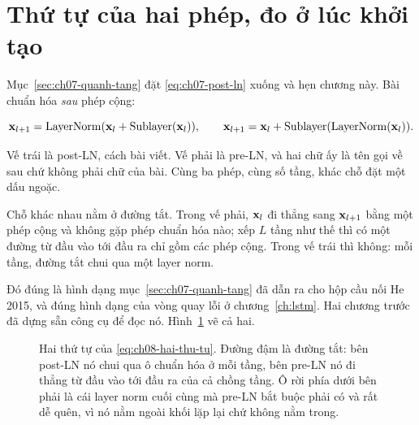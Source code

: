 \section{Thứ tự của hai phép, đo ở lúc khởi tạo}
\label{sec:ch08-thu-tu-ln}

%
Mục~\ref{sec:ch07-quanh-tang} đặt \eqref{eq:ch07-post-ln} xuống và hẹn chương
này. Bài chuẩn hóa \emph{sau} phép cộng:

\begin{equation}
  \mathbf{x}_{l+1} = \operatorname{LayerNorm}(\mathbf{x}_l + \mathrm{Sublayer}(\mathbf{x}_l)),
  \qquad
  \mathbf{x}_{l+1} = \mathbf{x}_l + \mathrm{Sublayer}(\operatorname{LayerNorm}(\mathbf{x}_l)).
  \label{eq:ch08-hai-thu-tu}
\end{equation}

Vế trái là post-LN, cách bài viết. Vế phải là pre-LN, và hai chữ ấy là tên gọi
về sau chứ không phải chữ của bài. Cùng ba phép, cùng số tầng, khác chỗ đặt một
dấu ngoặc.

%
Chỗ khác nhau nằm ở đường tắt. Trong vế phải, \(\mathbf{x}_l\) đi thẳng sang
\(\mathbf{x}_{l+1}\) bằng một phép cộng và không gặp phép chuẩn hóa nào; xếp
\(L\) tầng như thế thì có một đường từ đầu vào tới đầu ra chỉ gồm các phép cộng.
Trong vế trái thì không: mỗi tầng, đường tắt chui qua một layer norm.

Đó đúng là hình dạng mục~\ref{sec:ch07-quanh-tang} đã dẫn ra cho hộp cầu nối He
2015, và đúng hình dạng của vòng quay lỗi ở chương~\ref{ch:lstm}. Hai chương
trước đã dựng sẵn công cụ để đọc nó. Hình~\ref{fig:ch08-thu-tu-ln} vẽ cả hai.

\begin{figure}[htbp]
  \centering
  
  \caption{Hai thứ tự của \eqref{eq:ch08-hai-thu-tu}. Đường đậm là đường tắt:
    bên post-LN nó chui qua ô chuẩn hóa ở mỗi tầng, bên pre-LN nó đi thẳng từ
    đầu vào tới đầu ra của cả chồng tầng. Ô rời phía dưới bên phải là cái layer
    norm cuối cùng mà pre-LN bắt buộc phải có và rất dễ quên, vì nó nằm ngoài
    khối lặp lại chứ không nằm trong.}
  \label{fig:ch08-thu-tu-ln}
\end{figure}

